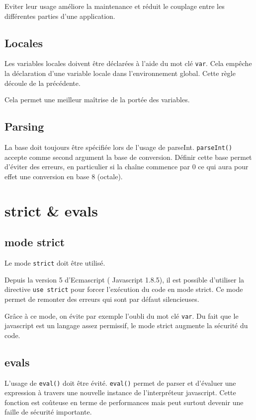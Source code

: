 			Eviter leur usage améliore la maintenance et réduit le couplage entre les différentes parties d'une application.

		\subsection{Locales}
			Les variables locales doivent être déclarées à l'aide du mot clé \verb+var+. Cela empêche la déclaration d'une variable locale dans l'environnement global. Cette règle découle de la précédente.

			Cela permet une meilleur maîtrise de la portée des variables.

		\subsection{Parsing}
			La base doit toujours être spécifiée lors de l'usage de parseInt. \verb+parseInt()+ accepte comme second argument la base de conversion. Définir cette base permet d'éviter des erreurs, en particulier si la chaîne commence par 0 ce qui aura pour effet une conversion en base 8 (octale).

	\section{strict \& evals}
		\subsection{mode strict}
			Le mode \verb+strict+ doit être utilisé.

			Depuis la version 5 d'Ecmascript ( Javascript 1.8.5), il est possible d'utiliser la directive \verb+use strict+ pour forcer l'exécution du code en mode strict. Ce mode permet de remonter des erreurs qui sont par défaut silencieuses.

			Grâce à ce mode, on évite par exemple l'oubli du mot clé \verb+var+. Du fait que le javascript est un langage assez permissif, le mode strict augmente la sécurité du code.

		\subsection{evals}
			L'usage de \verb+eval()+ doit être évité. \verb+eval()+ permet de parser et d'évaluer une expression à travers une nouvelle instance de l'interpréteur javascript. Cette fonction est coûteuse en terme de performances mais peut surtout devenir une faille de sécurité importante.

